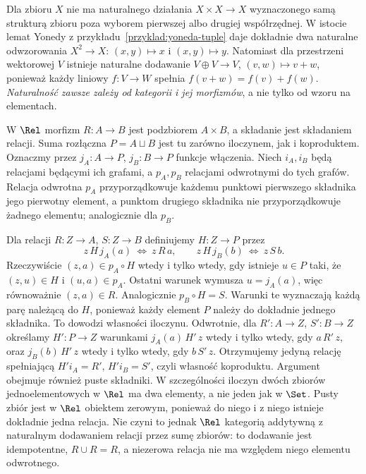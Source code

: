 \begin{przyklad}
Dla zbioru $X$ nie ma naturalnego działania $X\times X\to X$ wyznaczonego samą strukturą zbioru poza wyborem pierwszej albo drugiej współrzędnej. W istocie lemat Yonedy z przykładu~\ref{przyklad:yoneda-tuple} daje dokładnie dwa naturalne odwzorowania $X^2\to X$: $(x,y)\mapsto x$ i $(x,y)\mapsto y$. Natomiast dla przestrzeni wektorowej $V$ istnieje naturalne dodawanie $V\oplus V\to V$, $(v,w)\mapsto v+w$, ponieważ każdy liniowy $f:V\to W$ spełnia $f(v+w)=f(v)+f(w)$. \emph{Naturalność zawsze zależy od kategorii i jej morfizmów}, a nie tylko od wzoru na elementach.
\end{przyklad}


\begin{przyklad}\label{cat:ex:rel-biproduct}
W $\Rel$ morfizm $R:A\to B$ jest podzbiorem $A\times B$, a składanie jest składaniem relacji. Suma rozłączna $P=A\sqcup B$ jest tu zarówno iloczynem, jak i koproduktem. Oznaczmy przez $j_A:A\to P$, $j_B:B\to P$ funkcje włączenia. Niech $i_A,i_B$ będą relacjami będącymi ich grafami, a $p_A,p_B$ relacjami odwrotnymi do tych grafów. Relacja odwrotna $p_A$ przyporządkowuje każdemu punktowi pierwszego składnika jego pierwotny element, a punktom drugiego składnika nie przyporządkowuje żadnego elementu; analogicznie dla $p_B$.

Dla relacji $R:Z\to A$, $S:Z\to B$ definiujemy $H:Z\to P$ przez
\[
z\,H\,j_A(a)\ \Longleftrightarrow\ z\,R\,a,\qquad
z\,H\,j_B(b)\ \Longleftrightarrow\ z\,S\,b.
\]
Rzeczywiście $(z,a)\in p_A\circ H$ wtedy i tylko wtedy, gdy istnieje $u\in P$ taki, że $(z,u)\in H$ i $(u,a)\in p_A$. Ostatni warunek wymusza $u=j_A(a)$, więc równoważnie $(z,a)\in R$. Analogicznie $p_B\circ H=S$. Warunki te wyznaczają każdą parę należącą do $H$, ponieważ każdy element $P$ należy do dokładnie jednego składnika. To dowodzi własności iloczynu. Odwrotnie, dla $R':A\to Z$, $S':B\to Z$ określamy $H':P\to Z$ warunkami $j_A(a)\,H'\,z$ wtedy i tylko wtedy, gdy $a\,R'\,z$, oraz $j_B(b)\,H'\,z$ wtedy i tylko wtedy, gdy $b\,S'\,z$. Otrzymujemy jedyną relację spełniającą $H'i_A=R'$, $H'i_B=S'$, czyli własność koproduktu. Argument obejmuje również puste składniki. W szczególności iloczyn dwóch zbiorów jednoelementowych w $\Rel$ ma dwa elementy, a nie jeden jak w $\Set$. Pusty zbiór jest w $\Rel$ obiektem zerowym, ponieważ do niego i z niego istnieje dokładnie jedna relacja. Nie czyni to jednak $\Rel$ kategorią addytywną z naturalnym dodawaniem relacji przez sumę zbiorów: to dodawanie jest idempotentne, $R\cup R=R$, a niezerowa relacja nie ma względem niego elementu odwrotnego.
\end{przyklad}

